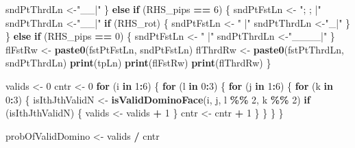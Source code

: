 \documentclass[
]{article}
\newenvironment{Shaded}{\begin{snugshade}}{\end{snugshade}}
\newcommand{\ControlFlowTok}[1]{\textcolor[rgb]{0.13,0.29,0.53}{\textbf{#1}}}
\newcommand{\DecValTok}[1]{\textcolor[rgb]{0.00,0.00,0.81}{#1}}
\newcommand{\FunctionTok}[1]{\textcolor[rgb]{0.13,0.29,0.53}{\textbf{#1}}}
\newcommand{\NormalTok}[1]{#1}
\newcommand{\OtherTok}[1]{\textcolor[rgb]{0.56,0.35,0.01}{#1}}
\newcommand{\SpecialCharTok}[1]{\textcolor[rgb]{0.81,0.36,0.00}{\textbf{#1}}}
\newcommand{\StringTok}[1]{\textcolor[rgb]{0.31,0.60,0.02}{#1}}
\begin{document}
\begin{Shaded}
\begin{Highlighting}[]
\NormalTok{    sndPtThrdLn }\OtherTok{\textless{}{-}}\StringTok{"\textquotesingle{}\_\textquotesingle{}\_|"}
\NormalTok{  \} }\ControlFlowTok{else} \ControlFlowTok{if}\NormalTok{ (RHS\_pips }\SpecialCharTok{==} \DecValTok{6}\NormalTok{) \{}
\NormalTok{    sndPtFstLn }\OtherTok{\textless{}{-}} \StringTok{"; ; |"}
\NormalTok{    sndPtThrdLn }\OtherTok{\textless{}{-}}\StringTok{"\textasciigrave{}\_\textasciigrave{}\_|"}
    \ControlFlowTok{if}\NormalTok{ (RHS\_rot) \{}
\NormalTok{      sndPtFstLn }\OtherTok{\textless{}{-}} \StringTok{"\textquotesingle{}\textquotesingle{}\textquotesingle{} |"}
\NormalTok{      sndPtThrdLn }\OtherTok{\textless{}{-}}\StringTok{"\textquotesingle{}\textquotesingle{}\textquotesingle{}\_|"}
\NormalTok{    \}}
\NormalTok{  \} }\ControlFlowTok{else} \ControlFlowTok{if}\NormalTok{ (RHS\_pips }\SpecialCharTok{==} \DecValTok{0}\NormalTok{) \{}
\NormalTok{    sndPtFstLn }\OtherTok{\textless{}{-}} \StringTok{"    |"}
\NormalTok{    sndPtThrdLn }\OtherTok{\textless{}{-}}\StringTok{"\_\_\_\_|"}
\NormalTok{  \}}
\NormalTok{  flFstRw }\OtherTok{\textless{}{-}} \FunctionTok{paste0}\NormalTok{(fstPtFstLn, sndPtFstLn)}
\NormalTok{  flThrdRw }\OtherTok{\textless{}{-}} \FunctionTok{paste0}\NormalTok{(fstPtThrdLn, sndPtThrdLn)}
  \FunctionTok{print}\NormalTok{(tpLn)}
  \FunctionTok{print}\NormalTok{(flFstRw)}
  \FunctionTok{print}\NormalTok{(flThrdRw)}
\NormalTok{\}}

\NormalTok{valids }\OtherTok{\textless{}{-}} \DecValTok{0}
\NormalTok{cntr }\OtherTok{\textless{}{-}} \DecValTok{0}
\ControlFlowTok{for}\NormalTok{ (i }\ControlFlowTok{in} \DecValTok{1}\SpecialCharTok{:}\DecValTok{6}\NormalTok{) \{}
  \ControlFlowTok{for}\NormalTok{ (l }\ControlFlowTok{in} \DecValTok{0}\SpecialCharTok{:}\DecValTok{3}\NormalTok{) \{}
    \ControlFlowTok{for}\NormalTok{ (j }\ControlFlowTok{in} \DecValTok{1}\SpecialCharTok{:}\DecValTok{6}\NormalTok{) \{}
      \ControlFlowTok{for}\NormalTok{ (k }\ControlFlowTok{in} \DecValTok{0}\SpecialCharTok{:}\DecValTok{3}\NormalTok{) \{}
\NormalTok{        isIthJthValidN }\OtherTok{\textless{}{-}} \FunctionTok{isValidDominoFace}\NormalTok{(i, j, l }\SpecialCharTok{\%\%} \DecValTok{2}\NormalTok{, k }\SpecialCharTok{\%\%} \DecValTok{2}\NormalTok{)}
        \ControlFlowTok{if}\NormalTok{ (isIthJthValidN) \{}
\NormalTok{          valids }\OtherTok{\textless{}{-}}\NormalTok{ valids }\SpecialCharTok{+} \DecValTok{1}
\NormalTok{        \}}
\NormalTok{        cntr }\OtherTok{\textless{}{-}}\NormalTok{ cntr }\SpecialCharTok{+} \DecValTok{1}
\NormalTok{      \}}
\NormalTok{    \}}
\NormalTok{  \}}
\NormalTok{\}}

\NormalTok{probOfValidDomino }\OtherTok{\textless{}{-}}\NormalTok{ valids }\SpecialCharTok{/}\NormalTok{ cntr}
\end{Highlighting}
\end{Shaded}
\end{document}
